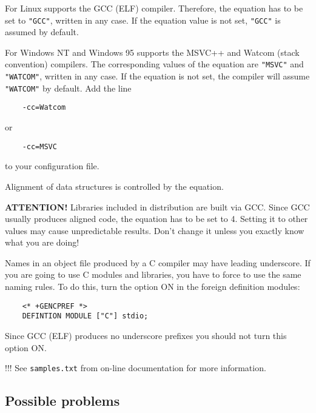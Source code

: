 \iflinux
  For Linux \XDS{} supports the GCC (ELF) compiler. Therefore, the 
  equation has to be set to \verb'"GCC"', written in any case. If the equation value
  is not set, \verb'"GCC"' is assumed by default.
\fi

\ifwinnt
  For Windows NT and Windows 95 \XDS{} supports the MSVC++ and Watcom
  (stack convention) compilers. The corresponding values of the 
  equation are \verb'"MSVC"' and \verb'"WATCOM"', written in any case.
  If the equation is not set, the compiler will assume \verb'"WATCOM"'
  by default. Add the line

  \verb'    -cc=Watcom'

  or

  \verb'    -cc=MSVC'

  to your configuration file.
\fi

Alignment of data structures is controlled by the  equation.

\iflinux
  {\bf ATTENTION!} Libraries included in \XDS{} distribution are built via
  GCC. Since GCC usually produces aligned code, the  equation
  has to be set to 4. Setting it to other values may cause unpredictable results.
  Don't change it unless you exactly know what you are doing!
\fi

Names in an object file produced by a C compiler may have leading
underscore. If you are going to use C modules and libraries, you have to
force \XDS{} to use the same naming rules. To do this, turn the
 option ON in the foreign definition modules:

\verb'    <* +GENCPREF *>' \\
\verb'    DEFINTION MODULE ["C"] stdio;'

\iflinux
Since GCC (ELF) produces no underscore prefixes you should not turn this option
ON.
\fi

\ifcomment !!!
See {\tt samples.txt} from \XDS{} on-line documentation for more
information.
\fi

\subsection{Possible problems}

